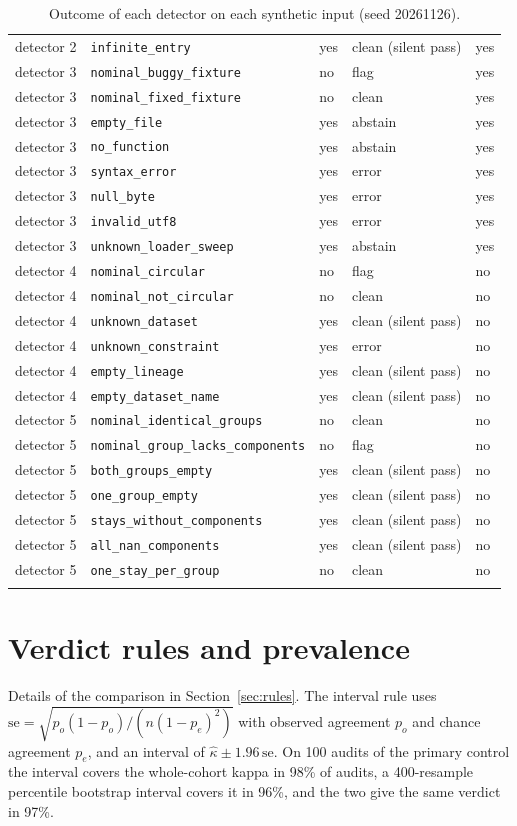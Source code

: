 \documentclass[10pt]{article}
\theoremstyle{definition}
\begin{document}
\begin{longtable}{@{}p{2.1cm}p{5.4cm}p{1.5cm}p{3.1cm}p{1.2cm}@{}}
detector 2 & \texttt{infinite\_entry} & yes & clean (silent pass) & yes\\
detector 3 & \texttt{nominal\_buggy\_fixture} & no & flag & yes\\
detector 3 & \texttt{nominal\_fixed\_fixture} & no & clean & yes\\
detector 3 & \texttt{empty\_file} & yes & abstain & yes\\
detector 3 & \texttt{no\_function} & yes & abstain & yes\\
detector 3 & \texttt{syntax\_error} & yes & error & yes\\
detector 3 & \texttt{null\_byte} & yes & error & yes\\
detector 3 & \texttt{invalid\_utf8} & yes & error & yes\\
detector 3 & \texttt{unknown\_loader\_sweep} & yes & abstain & yes\\
detector 4 & \texttt{nominal\_circular} & no & flag & no\\
detector 4 & \texttt{nominal\_not\_circular} & no & clean & no\\
detector 4 & \texttt{unknown\_dataset} & yes & clean (silent pass) & no\\
detector 4 & \texttt{unknown\_constraint} & yes & error & no\\
detector 4 & \texttt{empty\_lineage} & yes & clean (silent pass) & no\\
detector 4 & \texttt{empty\_dataset\_name} & yes & clean (silent pass) & no\\
detector 5 & \texttt{nominal\_identical\_groups} & no & clean & no\\
detector 5 & \texttt{nominal\_group\_lacks\_components} & no & flag & no\\
detector 5 & \texttt{both\_groups\_empty} & yes & clean (silent pass) & no\\
detector 5 & \texttt{one\_group\_empty} & yes & clean (silent pass) & no\\
detector 5 & \texttt{stays\_without\_components} & yes & clean (silent pass) & no\\
detector 5 & \texttt{all\_nan\_components} & yes & clean (silent pass) & no\\
detector 5 & \texttt{one\_stay\_per\_group} & no & clean & no\\
\bottomrule
\caption{Outcome of each detector on each synthetic input (seed 20261126).}
\label{tab:e17cells}
\end{longtable}

\section{Verdict rules and prevalence}
\label{apd:rules}
Details of the comparison in Section~\ref{sec:rules}. The interval rule uses $\mathrm{se}=\sqrt{p_o(1-p_o)/(n(1-p_e)^2)}$ with observed agreement $p_o$ and chance agreement $p_e$, and an interval of $\hat\kappa\pm1.96\,\mathrm{se}$. On 100 audits of the primary control the interval covers the whole-cohort kappa in 98\% of audits, a 400-resample percentile bootstrap interval covers it in 96\%, and the two give the same verdict in 97\%.
\end{document}
